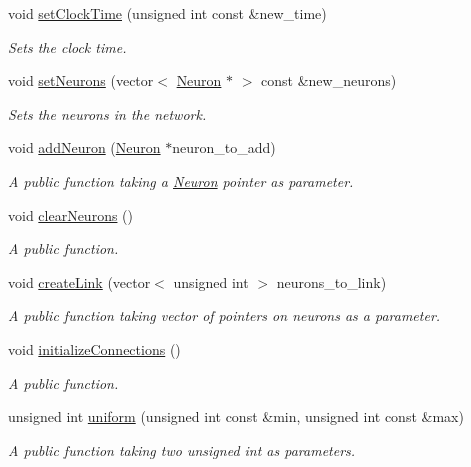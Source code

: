 \begin{DoxyCompactItemize}
void \hyperlink{classNetwork_a29c7bae73b6e6a54316fd8ab01a39d1a}{set\-Clock\-Time} (unsigned int const \&new\-\_\-time)
\begin{DoxyCompactList}\small\item\em Sets the clock time. \end{DoxyCompactList}\item 
void \hyperlink{classNetwork_a557c23dd89353bae628ebe6a968f5a7f}{set\-Neurons} (vector$<$ \hyperlink{classNeuron}{Neuron} $\ast$ $>$ const \&new\-\_\-neurons)
\begin{DoxyCompactList}\small\item\em Sets the neurons in the network. \end{DoxyCompactList}\item 
void \hyperlink{classNetwork_af89d1a0e70ef3a30e676031871fa784a}{add\-Neuron} (\hyperlink{classNeuron}{Neuron} $\ast$neuron\-\_\-to\-\_\-add)
\begin{DoxyCompactList}\small\item\em A public function taking a \hyperlink{classNeuron}{Neuron} pointer as parameter. \end{DoxyCompactList}\item 
void \hyperlink{classNetwork_a9bc7d1c48a7697d156049754bfd278f0}{clear\-Neurons} ()
\begin{DoxyCompactList}\small\item\em A public function. \end{DoxyCompactList}\item 
void \hyperlink{classNetwork_a66002602288e0fcb2eac9e45cbdca49a}{create\-Link} (vector$<$ unsigned int $>$ neurons\-\_\-to\-\_\-link)
\begin{DoxyCompactList}\small\item\em A public function taking vector of pointers on neurons as a parameter. \end{DoxyCompactList}\item 
void \hyperlink{classNetwork_a877fa66bfd9ce699eb60d3e467296677}{initialize\-Connections} ()
\begin{DoxyCompactList}\small\item\em A public function. \end{DoxyCompactList}\item 
unsigned int \hyperlink{classNetwork_a2202512d5859cdf5560a9e790c83cca1}{uniform} (unsigned int const \&min, unsigned int const \&max)
\begin{DoxyCompactList}\small\item\em A public function taking two unsigned int as parameters. \end{DoxyCompactList}\item 

\end{DoxyCompactItemize}
